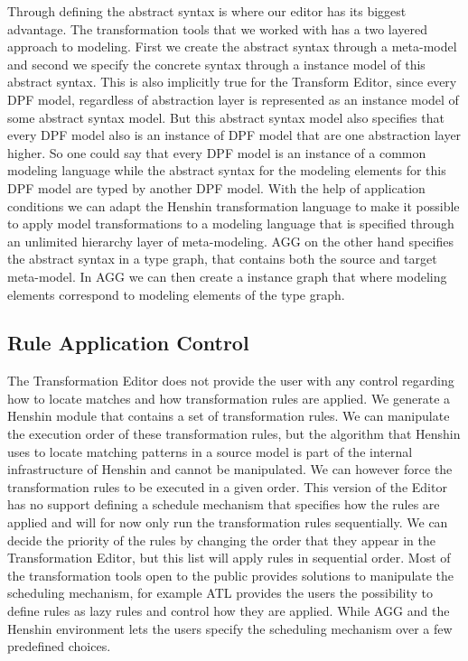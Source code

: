 Through defining the abstract syntax is where our editor has its biggest
advantage. The transformation tools that we worked with has a two layered
approach to modeling. First we create the abstract syntax through a meta-model
and second we specify the concrete syntax through a instance model of this
abstract syntax. This is also implicitly true for the Transform Editor, since
every DPF model, regardless of abstraction layer is represented as an instance
model of some abstract syntax model. But this abstract syntax model also
specifies that every DPF model also is an instance of DPF model that are one
abstraction layer higher. So one could say that every DPF model is an instance
of a common modeling language while the abstract syntax for the modeling
elements for this DPF model are typed by another DPF model. With the help of
application conditions we can adapt the Henshin transformation language to make
it possible to apply model transformations to a modeling language that is
specified through an unlimited hierarchy layer of meta-modeling. AGG on the
other hand specifies the abstract syntax in a type graph, that contains both the
source and target meta-model. In AGG we can then create a instance graph that
where modeling elements correspond to modeling elements of the type graph.  

\subsection{Rule Application Control}

The Transformation Editor does not provide the user with any control regarding
how to locate matches and how transformation rules are applied. We generate a
Henshin module that contains a set of transformation rules. We can manipulate
the execution order of these transformation rules, but the algorithm that
Henshin uses to locate matching patterns in a source model is part of the
internal infrastructure of Henshin and cannot be manipulated. We can however
force the transformation rules to be executed in a given order. This version of
the Editor has no support defining a schedule mechanism that specifies how the
rules are applied and will for now only run the transformation rules
sequentially. We can decide the priority of the rules by changing the order
that they appear in the Transformation Editor, but this list will apply rules in
sequential order. Most of the transformation tools open to the public provides
solutions to manipulate the scheduling mechanism, for example ATL provides the
users the possibility to define rules as lazy rules and control how they are
applied. While AGG and the Henshin environment lets the users specify the
scheduling mechanism over a few predefined choices. 

